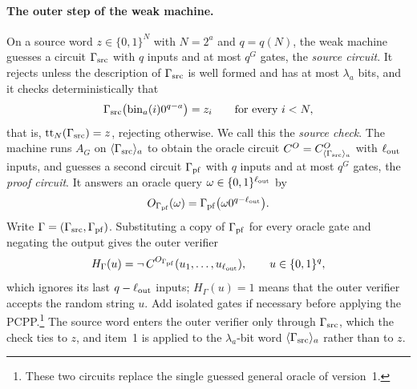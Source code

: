 \documentclass[11pt,letterpaper]{article}
\theoremstyle{definition}
\theoremstyle{remark}
\begin{document}
\paragraph{The outer step of the weak machine.}
On a source word $z\in\{0,1\}^N$ with $N=2^a$ and $q=q(N)$, the weak
machine guesses a circuit $\Gamma_{\rm src}$ with $q$ inputs and at most
$q^G$ gates, the \emph{source circuit}. It rejects unless the
description of $\Gamma_{\rm src}$ is well formed and has at most
$\lambda_a$ bits, and it checks deterministically that
\[
 \Gamma_{\rm src}\bigl(\mathrm{bin}_a(i)0^{q-a}\bigr)=z_i
 \qquad\text{for every }i<N,
\]
that is, $\mathrm{tt}_N(\Gamma_{\rm src})=z$, rejecting otherwise. We
call this the \emph{source check}. The machine runs $A_G$ on
$\langle\Gamma_{\rm src}\rangle_a$ to obtain the oracle circuit
$C^O=C^O_{\langle\Gamma_{\rm src}\rangle_a}$ with $\ell_{\rm out}$
inputs, and guesses a second circuit $\Gamma_{\rm pf}$ with $q$ inputs
and at most $q^G$ gates, the \emph{proof circuit}. It answers an oracle
query $\omega\in\{0,1\}^{\ell_{\rm out}}$ by
\[
 O_{\Gamma_{\rm pf}}(\omega)=\Gamma_{\rm pf}\bigl(\omega0^{q-\ell_{\rm out}}\bigr).
\]
Write $\Gamma=(\Gamma_{\rm src},\Gamma_{\rm pf})$. Substituting a copy of
$\Gamma_{\rm pf}$ for every oracle gate and negating the output gives
the outer verifier
\[
 H_\Gamma(u)=\neg\,C^{O_{\Gamma_{\rm pf}}}(u_1,\ldots,u_{\ell_{\rm out}}),
 \qquad u\in\{0,1\}^q,
\]
which ignores its last $q-\ell_{\rm out}$ inputs; $H_\Gamma(u)=1$ means
that the outer verifier accepts the random string $u$. Add isolated
gates if necessary before applying the PCPP.\footnote{These two
circuits replace the single guessed general oracle of version~1.} The
source word enters
the outer verifier only through $\Gamma_{\rm src}$, which the check ties
to $z$, and item~1 is applied to the $\lambda_a$-bit word
$\langle\Gamma_{\rm src}\rangle_a$ rather than to $z$.
\end{document}
